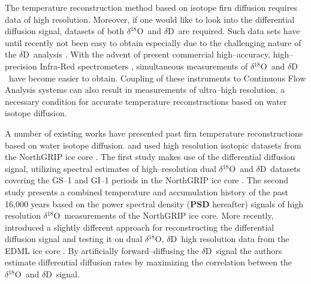 \documentclass[11pt, draftcls, onecolumn]{IEEEtran} %
\numberwithin{equation}{section}
\numberwithin{table}{section}
\numberwithin{figure}{section}
\newcommand{\delOx}{$\delta{}^{18}\mathrm{O}$}
\newcommand{\delD}{$\delta\mathrm{D}$}
\begin{document}
The temperature reconstruction method based on isotope firn diffusion requires 
data of high resolution. Moreover, if one would like to look into the differential diffusion signal, 
datasets of both \delOx~and \delD~are required. Such data sets have until recently not been easy to
obtain especially due to the challenging nature of the \delD~analysis \citep{BIGELEISEN1952, Vaughn1998}.
With the advent of present 	commercial high--accuracy, high--precision Infra-Red spectrometers 
\citep{Crosson2008, Brand2009}, simultaneous measurements of \delOx~and \delD~have become 
easier to obtain. Coupling of these instruments to Continuous Flow Analysis systems \citep{Gkinis2011, Emanuelsson2015,Jones2017a} 
can also result in measurements of ultra--high resolution, a necessary condition for 
accurate temperature reconstructions based on water isotope diffusion.

A number of existing works have presented past firn temperature reconstructions
based on water isotope diffusion. \cite{Simonsen2011} and \cite{Gkinis2014} used high resolution 
isotopic datasets from the NorthGRIP ice core \citep{NGRIPmembers2004}. The first study makes use
of the differential diffusion signal, utilizing spectral estimates of high--resolution 
dual  \delOx~and \delD~datasets covering
the GS--1 and GI--1 periods in the NorthGRIP ice core \citep{Rasmussen2014}. 
The second study 
presents a combined temperature and accumulation history of the past 16,000 years based on the 
power spectral density (\textbf{PSD} hereafter) signals of 
high resolution \delOx~measurements of the NorthGRIP ice core. More recently, \cite{vanderWel2015a}
introduced a slightly different approach for reconstructing the differential diffusion signal and testing it
on dual \delOx, \delD~high resolution data from the EDML ice core \citep{Oerter2004}. 
By artificially forward--diffusing the \delD~signal the authors estimate differential diffusion rates
by maximizing the correlation between the \delOx~and \delD~signal.  
\end{document}

